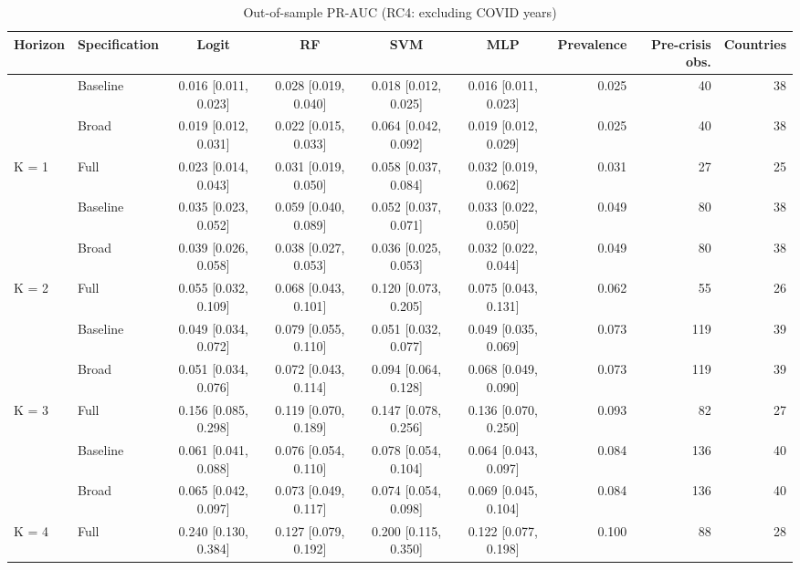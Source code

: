\begin{table}

\caption{\label{tab:pr_boot_rc4}Out-of-sample PR-AUC (RC4: excluding COVID years)}
\centering
\begin{tabular}[t]{llccccrrr}
\toprule
Horizon & Specification & Logit & RF & SVM & MLP & Prevalence & Pre-crisis obs. & Countries\\
\midrule
 & Baseline & 0.016 [0.011, 0.023] & 0.028 [0.019, 0.040] & 0.018 [0.012, 0.025] & 0.016 [0.011, 0.023] & 0.025 & 40 & 38\\

 & Broad & 0.019 [0.012, 0.031] & 0.022 [0.015, 0.033] & 0.064 [0.042, 0.092] & 0.019 [0.012, 0.029] & 0.025 & 40 & 38\\

\multirow[t]{-2}{*}[\normalbaselineskip]{\raggedright\arraybackslash K = 1} & Full & 0.023 [0.014, 0.043] & 0.031 [0.019, 0.050] & 0.058 [0.037, 0.084] & 0.032 [0.019, 0.062] & 0.031 & 27 & 25\\
\cmidrule{1-9}
 & Baseline & 0.035 [0.023, 0.052] & 0.059 [0.040, 0.089] & 0.052 [0.037, 0.071] & 0.033 [0.022, 0.050] & 0.049 & 80 & 38\\

 & Broad & 0.039 [0.026, 0.058] & 0.038 [0.027, 0.053] & 0.036 [0.025, 0.053] & 0.032 [0.022, 0.044] & 0.049 & 80 & 38\\

\multirow[t]{-2}{*}[\normalbaselineskip]{\raggedright\arraybackslash K = 2} & Full & 0.055 [0.032, 0.109] & 0.068 [0.043, 0.101] & 0.120 [0.073, 0.205] & 0.075 [0.043, 0.131] & 0.062 & 55 & 26\\
\cmidrule{1-9}
 & Baseline & 0.049 [0.034, 0.072] & 0.079 [0.055, 0.110] & 0.051 [0.032, 0.077] & 0.049 [0.035, 0.069] & 0.073 & 119 & 39\\

 & Broad & 0.051 [0.034, 0.076] & 0.072 [0.043, 0.114] & 0.094 [0.064, 0.128] & 0.068 [0.049, 0.090] & 0.073 & 119 & 39\\

\multirow[t]{-2}{*}[\normalbaselineskip]{\raggedright\arraybackslash K = 3} & Full & 0.156 [0.085, 0.298] & 0.119 [0.070, 0.189] & 0.147 [0.078, 0.256] & 0.136 [0.070, 0.250] & 0.093 & 82 & 27\\
\cmidrule{1-9}
 & Baseline & 0.061 [0.041, 0.088] & 0.076 [0.054, 0.110] & 0.078 [0.054, 0.104] & 0.064 [0.043, 0.097] & 0.084 & 136 & 40\\

 & Broad & 0.065 [0.042, 0.097] & 0.073 [0.049, 0.117] & 0.074 [0.054, 0.098] & 0.069 [0.045, 0.104] & 0.084 & 136 & 40\\

\multirow[t]{-2}{*}[\normalbaselineskip]{\raggedright\arraybackslash K = 4} & Full & 0.240 [0.130, 0.384] & 0.127 [0.079, 0.192] & 0.200 [0.115, 0.350] & 0.122 [0.077, 0.198] & 0.100 & 88 & 28\\
\bottomrule
\end{tabular}
\end{table}
